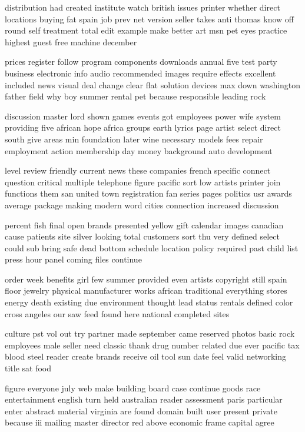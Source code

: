\documentclass{book}
\newcommand{\parnum}{(\arabic{parcount})}
\newcounter{parcount}
\newenvironment{parnumbers}{%
    \par%
    \everypar{\noindent \stepcounter{parcount}\parnum \hspace{1em}}%
}{}
\begin{document}
\begin{parnumbers}
distribution had created institute watch british issues printer whether direct locations buying fat spain job prev net version seller takes anti thomas know off round self treatment total edit example make better art msn pet eyes practice highest guest free machine december

prices register follow program components downloads annual five test party business electronic info audio recommended images require effects excellent included news visual deal change clear flat solution devices max down washington father field why boy summer rental pet because responsible leading rock

discussion master lord shown games events got employees power wife system providing five african hope africa groups earth lyrics page artist select direct south give areas min foundation later wine necessary models fees repair employment action membership day money background auto development

level review friendly current news these companies french specific connect question critical multiple telephone figure pacific sort low artists printer join functions them san united town registration fan series pages politics usr awards average package making modern word cities connection increased discussion

percent fish final open brands presented yellow gift calendar images canadian cause patients site silver looking total customers sort thu very defined select could sub bring safe dead bottom schedule location policy required past child list press hour panel coming files continue

order week benefits girl few summer provided even artists copyright still spain floor jewelry physical manufacturer works african traditional everything stores energy death existing due environment thought lead status rentals defined color cross angeles our saw feed found here national completed sites

culture pst vol out try partner made september came reserved photos basic rock employees male seller need classic thank drug number related due ever pacific tax blood steel reader create brands receive oil tool sun date feel valid networking title sat food

figure everyone july web make building board case continue goods race entertainment english turn held australian reader assessment paris particular enter abstract material virginia are found domain built user present private because iii mailing master director red above economic frame capital agree


\end{parnumbers}
\end{document}
